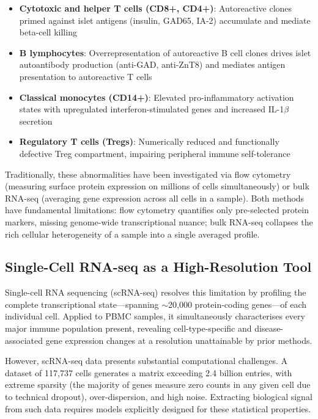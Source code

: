 \begin{itemize}
    \item \textbf{Cytotoxic and helper T cells (CD8+, CD4+)}: Autoreactive clones primed against islet antigens (insulin, GAD65, IA-2) accumulate and mediate beta-cell killing
    \item \textbf{B lymphocytes}: Overrepresentation of autoreactive B cell clones drives islet autoantibody production (anti-GAD, anti-ZnT8) and mediates antigen presentation to autoreactive T cells
    \item \textbf{Classical monocytes (CD14+)}: Elevated pro-inflammatory activation states with upregulated interferon-stimulated genes and increased IL-1$\beta$ secretion
    \item \textbf{Regulatory T cells (Tregs)}: Numerically reduced and functionally defective Treg compartment, impairing peripheral immune self-tolerance
\end{itemize}

Traditionally, these abnormalities have been investigated via flow cytometry (measuring surface protein expression on millions of cells simultaneously) or bulk RNA-seq (averaging gene expression across all cells in a sample). Both methods have fundamental limitations: flow cytometry quantifies only pre-selected protein markers, missing genome-wide transcriptional nuance; bulk RNA-seq collapses the rich cellular heterogeneity of a sample into a single averaged profile.

\subsection{Single-Cell RNA-seq as a High-Resolution Tool}

Single-cell RNA sequencing (scRNA-seq) resolves this limitation by profiling the complete transcriptional state---spanning $\sim$20,000 protein-coding genes---of each individual cell. Applied to PBMC samples, it simultaneously characterises every major immune population present, revealing cell-type-specific and disease-associated gene expression changes at a resolution unattainable by prior methods.

However, scRNA-seq data presents substantial computational challenges. A dataset of 117,737 cells generates a matrix exceeding 2.4 billion entries, with extreme sparsity (the majority of genes measure zero counts in any given cell due to technical dropout), over-dispersion, and high noise. Extracting biological signal from such data requires models explicitly designed for these statistical properties.

